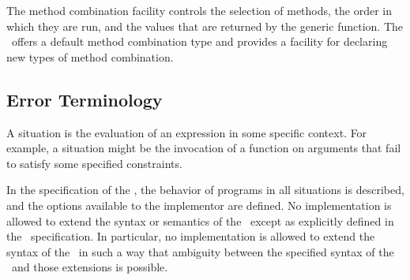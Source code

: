 The method combination facility controls the selection of methods, the
order in which they are run, and the values that are returned by the
generic function.  The \CLOS\ offers a default method combination type
and provides a facility for declaring new types of method combination.

\subsection{Error Terminology}
\label{Error-Terminology-SECTION}

A situation is the evaluation of an expression in some
specific context. For example, a situation might be the invocation of
a function on arguments that fail to satisfy some specified
constraints.

In the specification of the \CLOS, the behavior of programs in all situations
is described, and the options available to the implementor are defined. No
implementation is allowed to extend the syntax or semantics of the \OS\ except
as explicitly defined in the \OS\ specification. In particular, no
implementation is allowed to extend the syntax of the \OS\ in such a way that
ambiguity between the specified syntax of the \OS\ and those extensions is
possible.

